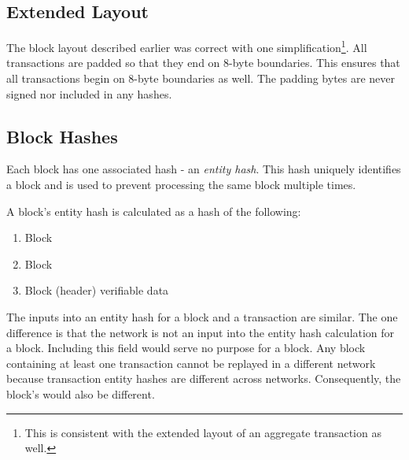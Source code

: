 \subsection{Extended Layout}

The block layout described earlier was correct with one simplification\footnote{
This is consistent with the extended layout of an aggregate transaction as well.}.
All transactions are padded so that they end on 8-byte boundaries.
This ensures that all transactions begin on 8-byte boundaries as well.
The padding bytes are never signed nor included in any hashes.

\begin{figure}[H]
\end{figure}

\subsection{Block Hashes}

Each block has one associated hash - an \emph{entity hash}.
This hash uniquely identifies a block and is used to prevent processing the same block multiple times.

A block's entity hash is calculated as a hash of the following:
\begin{enumerate}
	\item{Block }
	\item{Block }
	\item{Block (header) verifiable data}
\end{enumerate}

The inputs into an entity hash for a block and a transaction are similar.
The one difference is that the network  is not an input into the entity hash calculation for a block.
Including this field would serve no purpose for a block.
Any block containing at least one transaction cannot be replayed in a different network because transaction entity hashes are different across networks.
Consequently, the block's  would also be different.
